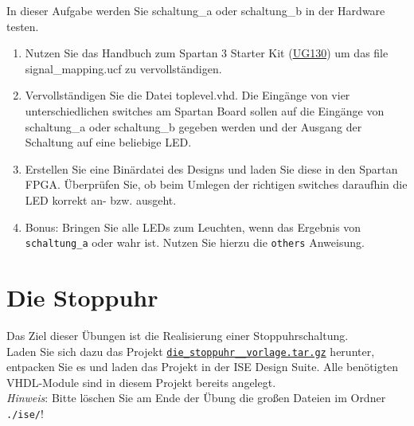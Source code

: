 \documentclass[12pt]{article}
\begin{document}
In dieser Aufgabe werden Sie schaltung\_a oder schaltung\_b in der Hardware testen.


\begin{enumerate}[label=\alph*.)]


\item Nutzen Sie das Handbuch zum Spartan 3 Starter Kit (\href{https://www.xilinx.com/support/documentation/boards_and_kits/ug130.pdf}{UG130}) um das file signal\_mapping.ucf
zu vervollständigen.


\item Vervollständigen Sie die Datei toplevel.vhd. Die Eingänge von vier unterschiedlichen switches
am Spartan Board sollen auf die Eingänge von schaltung\_a oder schaltung\_b gegeben werden
und der Ausgang der Schaltung auf eine beliebige LED.


\item Erstellen Sie eine Binärdatei des Designs und laden Sie diese in den Spartan FPGA.
Überprüfen Sie, ob beim Umlegen der richtigen switches daraufhin die LED korrekt an- bzw.
ausgeht.


\item Bonus: Bringen Sie alle LEDs zum Leuchten, wenn das Ergebnis von \texttt{schaltung\_a} oder  wahr ist. Nutzen Sie hierzu die \texttt{others} Anweisung.


\end{enumerate}





\part*{Die Stoppuhr}


Das Ziel dieser Übungen ist die Realisierung einer Stoppuhrschaltung.\\

Laden Sie sich dazu das Projekt \textcolor{blue}{\href{https://ilias.uni-freiburg.de/goto.php?target=file_2291010_download&client_id=unifreiburg}{\texttt{die\_stoppuhr\_\_vorlage.tar.gz}}} herunter, entpacken Sie es und laden das Projekt in der ISE Design Suite. Alle benötigten VHDL-Module sind in diesem Projekt bereits angelegt.\\

\textit{Hinweis}: Bitte löschen Sie am Ende der Übung die großen Dateien im Ordner \texttt{./ise/}!
\end{document}

